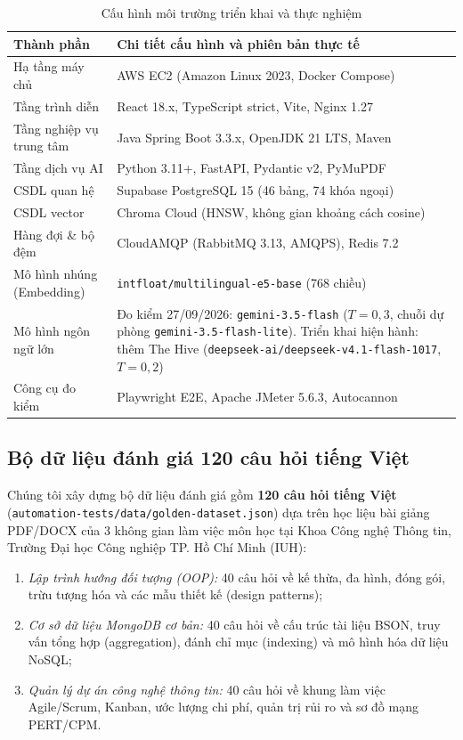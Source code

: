 \documentclass{IEEEtran}
\begin{document}
\begin{table}[t]
\caption{Cấu hình môi trường triển khai và thực nghiệm}
\label{tab:system_config}
\centering
\scriptsize
\setlength{\tabcolsep}{3pt}
\begin{tabularx}{\columnwidth}{|L{2.55cm}|Y|}
\hline
\textbf{Thành phần} & \textbf{Chi tiết cấu hình và phiên bản thực tế} \\
\hline
Hạ tầng máy chủ & AWS EC2 (Amazon Linux 2023, Docker Compose) \\
Tầng trình diễn & React 18.x, TypeScript strict, Vite, Nginx 1.27 \\
Tầng nghiệp vụ trung tâm & Java Spring Boot 3.3.x, OpenJDK 21 LTS, Maven \\
Tầng dịch vụ AI & Python 3.11+, FastAPI, Pydantic v2, PyMuPDF \\
CSDL quan hệ & Supabase PostgreSQL 15 (46 bảng, 74 khóa ngoại) \\
CSDL vector & Chroma Cloud (HNSW, không gian khoảng cách cosine) \\
Hàng đợi \& bộ đệm & CloudAMQP (RabbitMQ 3.13, AMQPS), Redis 7.2 \\
Mô hình nhúng (Embedding) & \texttt{intfloat/multilingual-e5-base} (768 chiều) \\
Mô hình ngôn ngữ lớn & Đo kiểm 27/09/2026: \texttt{gemini-3.5-flash} ($T=0{,}3$, chuỗi dự phòng \texttt{gemini-3.5-flash-lite}). Triển khai hiện hành: thêm The Hive (\texttt{deepseek-ai/deepseek-v4.1-flash-1017}, $T=0{,}2$) \\
Công cụ đo kiểm & Playwright E2E, Apache JMeter 5.6.3, Autocannon \\
\hline
\end{tabularx}
\end{table}

\subsection{Bộ dữ liệu đánh giá 120 câu hỏi tiếng Việt}
\label{subsec:golden_dataset}
Chúng tôi xây dựng bộ dữ liệu đánh giá gồm \textbf{120 câu hỏi tiếng Việt} (\texttt{automation-tests/data/golden-dataset.json}) dựa trên học liệu bài giảng PDF/DOCX của 3 không gian làm việc môn học tại Khoa Công nghệ Thông tin, Trường Đại học Công nghiệp TP. Hồ Chí Minh (IUH):
\begin{enumerate}
    \item \textit{Lập trình hướng đối tượng (OOP):} 40 câu hỏi về kế thừa, đa hình, đóng gói, trừu tượng hóa và các mẫu thiết kế (design patterns);
    \item \textit{Cơ sở dữ liệu MongoDB cơ bản:} 40 câu hỏi về cấu trúc tài liệu BSON, truy vấn tổng hợp (aggregation), đánh chỉ mục (indexing) và mô hình hóa dữ liệu NoSQL;
    \item \textit{Quản lý dự án công nghệ thông tin:} 40 câu hỏi về khung làm việc Agile/Scrum, Kanban, ước lượng chi phí, quản trị rủi ro và sơ đồ mạng PERT/CPM.
\end{enumerate}
\end{document}
